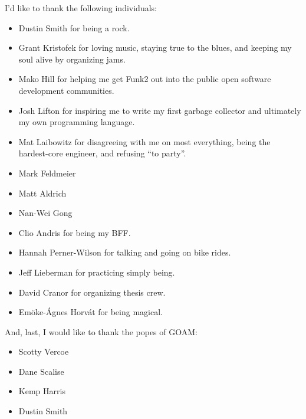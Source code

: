 \vspace{5mm}

I'd like to thank the following individuals:
\begin{itemize}
\item{Dustin Smith for being a rock.}
\item{Grant Kristofek for loving music, staying true to the blues, and keeping my soul alive by organizing jams.}
\item{Mako Hill for helping me get Funk2 out into the public open software development communities.}
\item{Josh Lifton for inspiring me to write my first garbage collector and ultimately my own programming language.}
\item{Mat Laibowitz for disagreeing with me on most everything, being the hardest-core engineer, and refusing ``to party''.}
\item{Mark Feldmeier}
\item{Matt Aldrich}
\item{Nan-Wei Gong}
\item{Clio Andris for being my BFF.}
\item{Hannah Perner-Wilson for talking and going on bike rides.}
\item{Jeff Lieberman for practicing simply being.}
\item{David Cranor for organizing thesis crew.}
\item{Em\"{o}ke-\'{A}gnes Horv\'{a}t for being magical.}
\end{itemize}

\vspace{5mm}

And, last, I would like to thank the popes of GOAM:
\begin{itemize}
\item{Scotty Vercoe}
\item{Dane Scalise}
\item{Kemp Harris}
\item{Dustin Smith}
\end{itemize}

\endgroup


